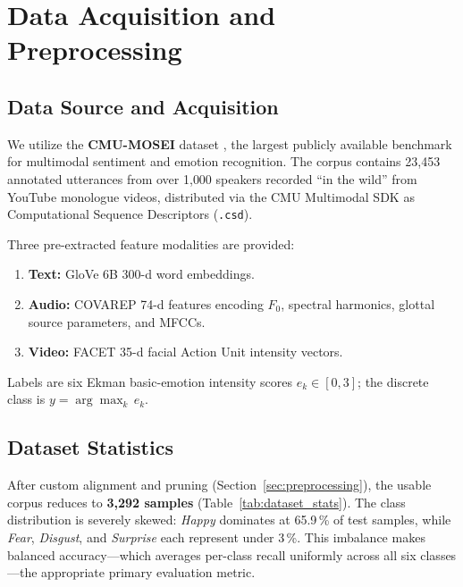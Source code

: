 \documentclass[conference]{IEEEtran}
\begin{document}
\section{Data Acquisition and Preprocessing}

\subsection{Data Source and Acquisition}
We utilize the \textbf{CMU-MOSEI} dataset \cite{zadeh2018mosei}, the largest
publicly available benchmark for multimodal sentiment and emotion recognition.
The corpus contains 23{,}453 annotated utterances from over 1{,}000 speakers
recorded ``in the wild'' from YouTube monologue videos, distributed via the
CMU Multimodal SDK as Computational Sequence Descriptors (\texttt{.csd}).

Three pre-extracted feature modalities are provided:
\begin{enumerate}
    \item \textbf{Text:} GloVe 6B 300-d word embeddings.
    \item \textbf{Audio:} COVAREP 74-d features encoding $F_0$, spectral
    harmonics, glottal source parameters, and MFCCs.
    \item \textbf{Video:} FACET 35-d facial Action Unit intensity vectors.
\end{enumerate}

Labels are six Ekman basic-emotion intensity scores $e_k \in [0,3]$; the
discrete class is $y = \arg\max_k\,e_k$.

\subsection{Dataset Statistics}
After custom alignment and pruning (Section~\ref{sec:preprocessing}), the
usable corpus reduces to \textbf{3{,}292 samples}
(Table~\ref{tab:dataset_stats}).  The class distribution is severely skewed:
\emph{Happy} dominates at 65.9\,\% of test samples, while \emph{Fear},
\emph{Disgust}, and \emph{Surprise} each represent under 3\,\%.  This
imbalance makes balanced accuracy---which averages per-class recall uniformly
across all six classes---the appropriate primary evaluation metric.
\end{document}
